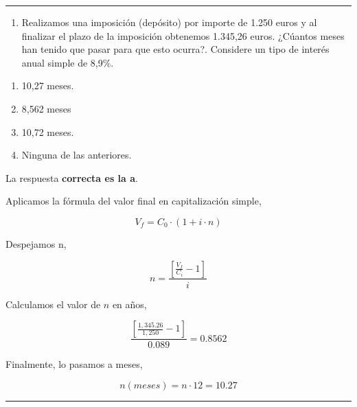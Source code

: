\documentclass[
  letterpaper,
  DIV=11,
  numbers=noendperiod]{scrreprt}
\providecommand{\tightlist}{%
  \setlength{\itemsep}{0pt}\setlength{\parskip}{0pt}}\usepackage{longtable,booktabs,array}
\begin{document}
\begin{center}\rule{0.5\linewidth}{0.5pt}\end{center}

\begin{enumerate}
\def\labelenumi{\arabic{enumi}.}
\setcounter{enumi}{1}
\tightlist
\item
  Realizamos una imposición (depósito) por importe de 1.250 euros y al
  finalizar el plazo de la imposición obtenemos 1.345,26 euros. ¿Cúantos
  meses han tenido que pasar para que esto ocurra?. Considere un tipo de
  interés anual simple de 8,9\%.
\end{enumerate}

\begin{enumerate}
\def\labelenumi{\alph{enumi})}
\item
  10,27 meses.
\item
  8,562 meses
\item
  10,72 meses.
\item
  Ninguna de las anteriores.
\end{enumerate}

\begin{tcolorbox}[enhanced jigsaw, left=2mm, opacityback=0, colback=white, breakable, arc=.35mm, bottomrule=.15mm, rightrule=.15mm, toprule=.15mm, leftrule=.75mm, colframe=quarto-callout-tip-color-frame]
\begin{minipage}[t]{5.5mm}
\textcolor{quarto-callout-tip-color}{\faLightbulb}
\end{minipage}%
\begin{minipage}[t]{\textwidth - 5.5mm}

La respuesta \textbf{correcta es la a}.

Aplicamos la fórmula del valor final en capitalización simple,

\[V_f=C_0\cdot(1+i\cdot n)\]

Despejamos n,

\[n=\frac{\left[\frac{V_f}{C_i}-1\right]}{i}\]

Calculamos el valor de \(n\) en años,

\[\frac{\left[\frac{1,345.26}{1,250}-1\right]}{0.089}=0.8562\]

Finalmente, lo pasamos a meses,

\[n\left(meses\right)=n\cdot12=10.27\]

\end{minipage}%
\end{tcolorbox}

\begin{center}\rule{0.5\linewidth}{0.5pt}\end{center}
\end{document}
